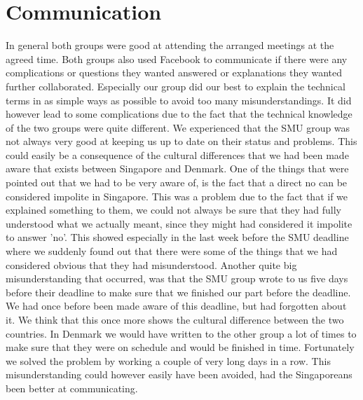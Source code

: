 \section{Communication}
In general both groups were good at attending the arranged meetings at the agreed time.
Both groups also used Facebook to communicate if there were any complications or questions they wanted answered or explanations they wanted further collaborated.
Especially our group did our best to explain the technical terms in as simple ways as possible to avoid too many misunderstandings. It did however lead to some
complications due to the fact that the technical knowledge of the two groups were quite different.
We experienced that the SMU group was not always very good at keeping us up to date on their status and problems. This could easily be a consequence of the cultural differences
that we had been made aware that exists between Singapore and Denmark. One of the things that were pointed out that we had to be very aware of, is the fact that a direct no
can be considered impolite in Singapore. This was a problem due to the fact that if we explained something to them, we could not always be sure that they had fully understood
what we actually meant, since they might had considered it impolite to answer 'no'. This showed especially in the last week before the SMU deadline where we suddenly found out
that there were some of the things that we had considered obvious that they had misunderstood. Another quite big misunderstanding that occurred, was that the SMU group wrote
to us five days before their deadline to make sure that we finished our part before the deadline. We had once before been made aware of this deadline, but had forgotten 
about it. We think that this once more shows the cultural difference between the two countries. In Denmark we would have written to the other group a lot of times
to make sure that they were on schedule and would be finished in time. Fortunately we solved the problem by working a couple of very long days in a row. This misunderstanding
could however easily have been avoided, had the Singaporeans been better at communicating. 

